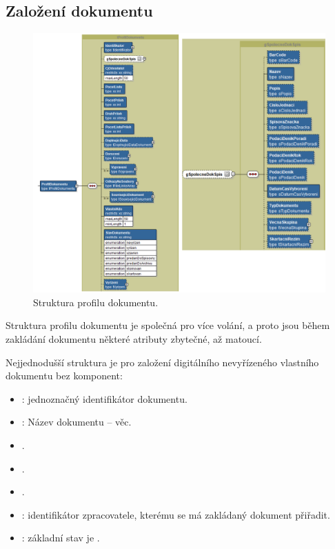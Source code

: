 \documentclass[
  master,
  field=ainfp,
  biblatex,
  language=czech,
  glossaries,
  theorems=false,
  index
]{kidiplom}
\begin{document}
\subsection{Založení dokumentu}
\begin{figure}[h]
  \centerline{\includegraphics[width=0.9\linewidth]{./images/ProfilDokumentu.png}} 
  \caption{Struktura profilu dokumentu.} 
\end{figure}

Struktura profilu dokumentu je společná pro více volání, a proto jsou během zakládání dokumentu některé atributy zbytečné, až matoucí.

Nejjednodušší struktura je pro založení digitálního nevyřízeného vlastního dokumentu bez komponent:
\begin{itemize}
	\item {}: jednoznačný identifikátor dokumentu.
	\item {}: Název dokumentu -- věc.
	\item {}.
	\item {}.
	\item {}.
	\item {}: identifikátor zpracovatele, kterému se má zakládaný dokument přiřadit.
	\item {}: základní stav je .
\end{itemize}
\end{document}
